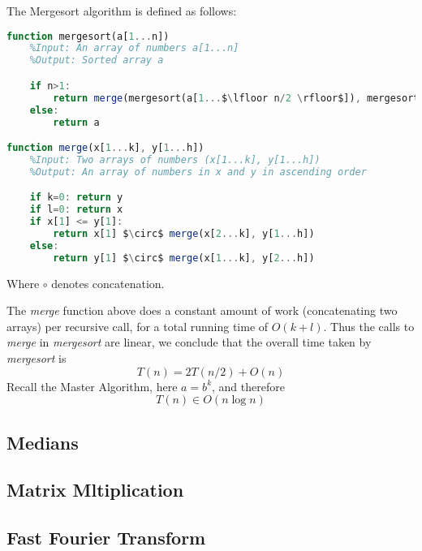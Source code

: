 \begin{definition}[Mergesort]
The Mergesort algorithm is defined as follows:
\begin{lstlisting}[mathescape=true, language=Octave]
function mergesort(a[1...n])
	%Input: An array of numbers a[1...n]
	%Output: Sorted array a

	if n>1:
		return merge(mergesort(a[1...$\lfloor n/2 \rfloor$]), mergesort(a[$\lfloor n/2 \rfloor$+1...n]))
	else:
		return a

function merge(x[1...k], y[1...h])
	%Input: Two arrays of numbers (x[1...k], y[1...h])
	%Output: An array of numbers in x and y in ascending order

	if k=0: return y
	if l=0: return x
	if x[1] <= y[1]:
		return x[1] $\circ$ merge(x[2...k], y[1...h])
	else:
		return y[1] $\circ$ merge(x[1...k], y[2...h])
\end{lstlisting}
Where $\circ$ denotes concatenation.
\end{definition}

The \textit{merge} function above does a constant amount of work (concatenating two arrays) per recursive call, for a total running time of $O(k + l)$. Thus the calls to \textit{merge} in \textit{mergesort} are linear, we conclude that the overall time taken by \textit{mergesort} is
\[
T(n) = 2T(n/2) + O(n)
\]
Recall the Master Algorithm, here $a=b^k$, and therefore
\[
T(n) \in O(n\log n)
\]

\subsection{Medians}

\subsection{Matrix Mltiplication}

\begin{definition}

\end{definition}

\subsection{Fast Fourier Transform}